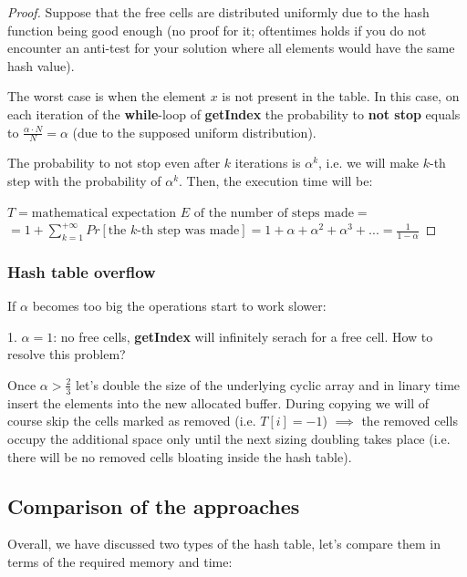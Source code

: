 \begin{proof}

    Suppose that the free cells are distributed uniformly due to the hash function being good enough (no proof for it; oftentimes holds if you do not encounter an anti-test for your solution where all elements would have the same hash value).

    The worst case is when the element $x$ is not present in the table. In this case, on each iteration of the \textbf{while}-loop of \textbf{getIndex} the probability to \textbf{not stop} equals to $\frac{\alpha \cdot N}{N} = \alpha$ (due to the supposed uniform distribution).

    The probability to not stop even after $k$ iterations is $\alpha^k$, i.e. we will make $k$-th step with the probability of $\alpha^k$. Then, the execution time will be:

    $T = \text{mathematical expectation $E$ of the number of steps made} =$
    $= 1 + \sum_{k=1}^{+\infty} Pr[\text{the $k$-th step was made}] = 1 + \alpha + \alpha^2 + \alpha^3 + ... = \frac{1}{1-\alpha} $

\end{proof}

\subsubsection{Hash table overflow}

If $\alpha$ becomes too big the operations start to work slower:

1. $\alpha = 1$: no free cells, \textbf{getIndex} will infinitely serach for a free cell. How to resolve this problem?

Once $\alpha > \frac{2}{3}$ let's double the size of the underlying cyclic array and in linary time insert the elements into the new allocated buffer. During copying we will of course skip the cells marked as removed (i.e. $T[i] = -1$) $\implies$ the removed cells occupy the additional space only until the next sizing doubling takes place (i.e. there will be no removed cells bloating inside the hash table).

\subsection{Comparison of the approaches}

Overall, we have discussed two types of the hash table, let's compare them in terms of the required memory and time:


